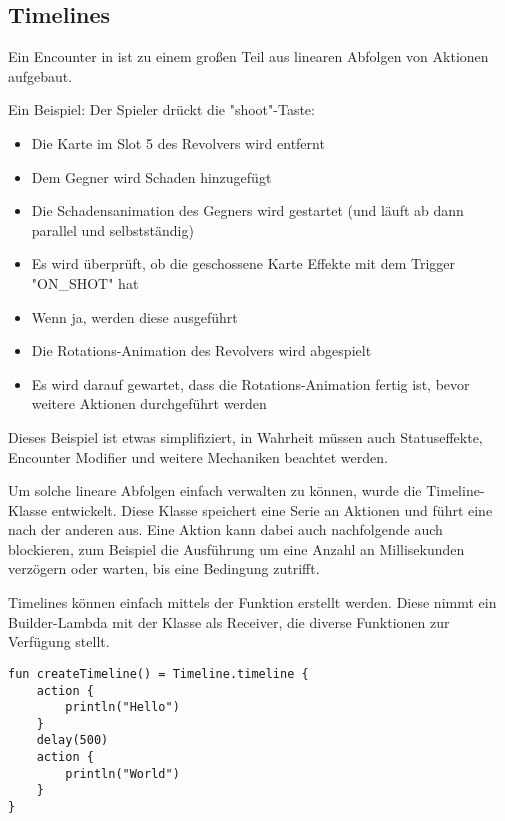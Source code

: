 
\subsection{Timelines}\label{subsec:timelines}

\renewcommand{\kapitelautor}{Autor: Marvin Kurka}

Ein Encounter in \FF ist zu einem großen Teil aus linearen Abfolgen von Aktionen aufgebaut.

Ein Beispiel: Der Spieler drückt die "shoot"-Taste:
\begin{itemize}
    \item Die Karte im Slot 5 des Revolvers wird entfernt
    \item Dem Gegner wird Schaden hinzugefügt
    \item Die Schadensanimation des Gegners wird gestartet (und läuft ab dann parallel und selbstständig)
    \item Es wird überprüft, ob die geschossene Karte Effekte mit dem Trigger "ON\_SHOT" hat
    \item Wenn ja, werden diese ausgeführt
    \item Die Rotations-Animation des Revolvers wird abgespielt
    \item Es wird darauf gewartet, dass die Rotations-Animation fertig ist, bevor weitere Aktionen durchgeführt werden
\end{itemize}

Dieses Beispiel ist etwas simplifiziert, in Wahrheit müssen auch Statuseffekte, Encounter Modifier und weitere Mechaniken
beachtet werden.

Um solche lineare Abfolgen einfach verwalten zu können, wurde die Timeline-Klasse entwickelt.
Diese Klasse speichert eine Serie an Aktionen und führt eine nach der anderen aus.
Eine Aktion kann dabei auch nachfolgende auch blockieren, zum Beispiel die Ausführung um eine Anzahl an
Millisekunden verzögern oder warten, bis eine Bedingung zutrifft.

Timelines können einfach mittels der  Funktion erstellt werden.
Diese nimmt ein Builder-Lambda mit der  Klasse als Receiver, die diverse Funktionen
zur Verfügung stellt.

\begin{verbatim}
fun createTimeline() = Timeline.timeline {
    action {
        println("Hello")
    }
    delay(500)
    action {
        println("World")
    }
}
\end{verbatim}

